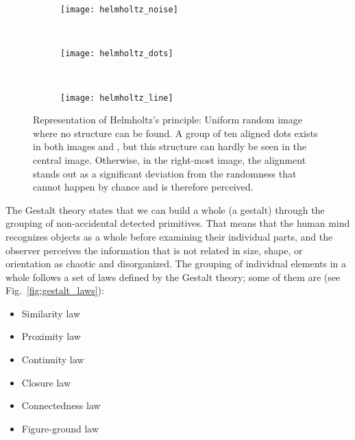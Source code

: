 \begin{figure}[!ht]
    \centering
    \begin{subfigure}[b]{0.25\textwidth}
        \texttt{[image: helmholtz\_noise]}
        \caption{}
        \label{fig:helmholtz_noise}
    \end{subfigure}
        ~ %
    \begin{subfigure}[b]{0.25\textwidth}
        \texttt{[image: helmholtz\_dots]}
        \caption{}
        \label{fig:helmholtz_dots}
    \end{subfigure}
        ~ %
    \begin{subfigure}[b]{0.25\textwidth}
        \texttt{[image: helmholtz\_line]}
        \caption{}
        \label{fig:helmholtz_line}
    \end{subfigure}
        
    \caption{Representation of Helmholtz's principle:  Uniform random image where no structure can be found. A group of ten aligned dots exists in both images and , but this structure can hardly be seen in the central image. Otherwise, in the right-most image, the alignment stands out as a significant deviation from the randomness that cannot happen by chance and is therefore perceived.}\label{fig:helmholtz_principle}
\end{figure}

The Gestalt theory \citep{Wertheimer:Psycologische:1923} states that we can build a whole (a gestalt) through the grouping of non-accidental detected primitives. That means that the human mind recognizes objects as a whole before examining their individual parts, and the observer perceives the information that is not related in size, shape, or orientation as chaotic and disorganized. The grouping of individual elements in a whole follows a set of laws defined by the Gestalt theory; some of them are (see Fig.\ \ref{fig:gestalt_laws}):

\begin{itemize}
	\item Similarity law
	\item Proximity law
	\item Continuity law
	\item Closure law
	\item Connectedness law
	\item Figure-ground law	
\end{itemize}


